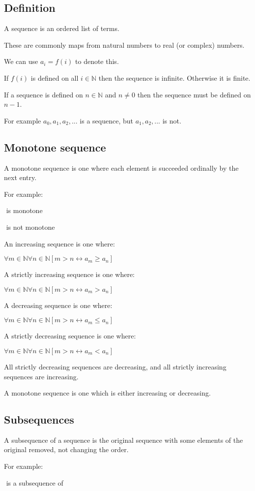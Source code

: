 
\subsection{Definition}

A sequence is an ordered list of terms.

These are commonly maps from natural numbers to real (or complex) numbers.

We can use \(a_i=f(i)\) to denote this.

If \(f(i)\) is defined on all \(i\in \mathbb{N}\) then the sequence is infinite. Otherwise it is finite.

If a sequence is defined on \(n\in \mathbb{N}\) and \(n\ne 0\) then the sequence must be defined on \(n-1\).

For example \(a_0, a_1, a_2,...\) is a sequence, but \(a_1,a_2,...\) is not.

\subsection{Monotone sequence}

A monotone sequence is one where each element is succeeded ordinally by the next entry.

For example:

\(<1,2,3,6,7>\) is monotone

\(<1,2,3,3,4>\) is not monotone

An increasing sequence is one where:

\(\forall m \in \mathbb{N} \forall n\in \mathbb{N} [m > n \leftrightarrow a_m \ge a_n]\)

A strictly increasing sequence is one where:

\(\forall m \in \mathbb{N} \forall n\in \mathbb{N} [m > n \leftrightarrow a_m > a_n]\)

A decreasing sequence is one where:

\(\forall m \in \mathbb{N} \forall n\in \mathbb{N} [m > n \leftrightarrow a_m \le a_n]\)

A strictly decreasing sequence is one where:

\(\forall m \in \mathbb{N} \forall n\in \mathbb{N} [m > n \leftrightarrow a_m < a_n]\)

All strictly decreasing sequences are decreasing, and all strictly increasing sequences are increasing.

A monotone sequence is one which is either increasing or decreasing.

\subsection{Subsequences}

A subsequence of a sequence is the original sequence with some elements of the original removed, not changing the order.

For example:

\(<1,3,5>\) is a subsequence of \(<2,1,3,4,7,5>\)

